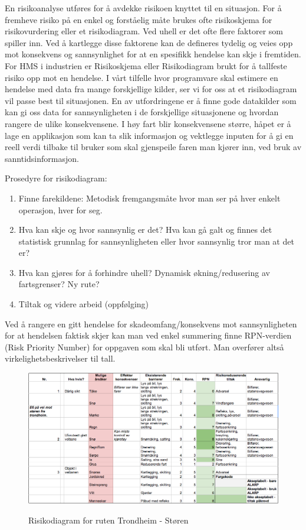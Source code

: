\documentclass[a4paper,norsk,oneside]{book}
\begin{document}
En risikoanalyse utføres for å avdekke risikoen knyttet til en situasjon. For å fremheve risiko på en enkel og forståelig måte brukes ofte risikoskjema for risikovurdering eller et risikodiagram. Ved uhell er det ofte flere faktorer som spiller inn. Ved å kartlegge disse faktorene kan de defineres tydelig og veies opp mot konsekvens og sannsynlighet for at en spesifikk hendelse kan skje i fremtiden. For HMS i industrien er Risikoskjema eller Risikodiagram brukt for å tallfeste risiko opp mot en hendelse. I vårt tilfelle hvor programvare skal estimere en hendelse med data fra mange forskjellige kilder, ser vi for oss at et risikodiagram vil passe best til situasjonen. En av utfordringene er å finne gode datakilder som kan gi oss data for sannsynligheten i de forskjellige situasjonene og hvordan rangere de ulike konsekvensene. I høy fart blir konsekvensene større, håpet er å lage en applikasjon som kan ta slik informasjon og vektlegge inputen for å gi en reell verdi tilbake til bruker som skal gjenspeile faren man kjører inn, ved bruk av sanntidsinformasjon.

Prosedyre for risikodiagram:
\begin{enumerate}
\item Finne farekildene: Metodisk fremgangsmåte hvor man ser på hver enkelt operasjon, hver for seg.
\item Hva kan skje og hvor sannsynlig er det? Hva kan gå galt og finnes det statistisk grunnlag for sannsynligheten eller hvor sannsynlig tror man at det er?
\item Hva kan gjøres for å forhindre uhell? Dynamisk økning/redusering av fartsgrenser? Ny rute?
\item Tiltak og videre arbeid (oppfølging)
\end{enumerate}

Ved å rangere en gitt hendelse for skadeomfang/konsekvens mot sannsynligheten for at hendelsen faktisk skjer kan man ved enkel summering finne RPN-verdien (Risk Priority Number) for oppgaven som skal bli utført. Man overfører altså virkelighetsbeskrivelser til tall.  


\begin{figure}[H]
\centering
\includegraphics[scale=0.25]{figs/risiko1}
\label{fig:risiko1}
\caption{Risikodiagram for ruten Trondheim - Støren}
\end{figure}
\end{document}
